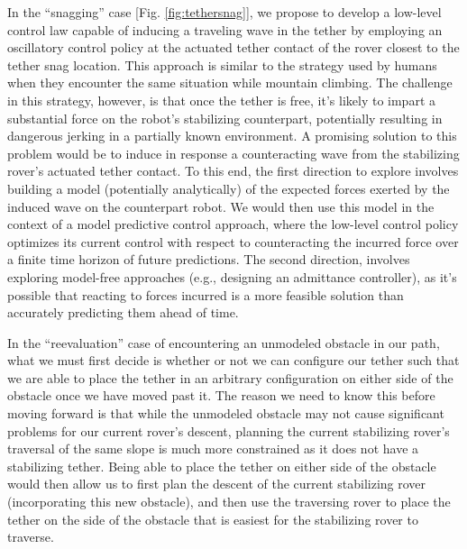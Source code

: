 \documentclass[12pt]{article}
\begin{document}

In the ``snagging'' case [Fig. \ref{fig:tethersnag}], we propose to
develop a low-level control law capable of inducing a traveling wave
in the tether by employing an oscillatory control policy at the
actuated tether contact of the rover closest to the tether snag
location. This approach is similar to the strategy used by humans when
they encounter the same situation while mountain climbing.  The
challenge in this strategy, however, is that once the tether is free,
it's likely to impart a substantial force on the robot's stabilizing
counterpart, potentially resulting in dangerous jerking in a partially
known environment.  A promising solution to this problem would be to
induce in response a counteracting wave from the stabilizing rover's
actuated tether contact. To this end, the first direction to explore
involves building a model (potentially analytically) of the expected
forces exerted by the induced wave on the counterpart robot.  We would
then use this model in the context of a model predictive control
approach, where the low-level control policy optimizes its current
control with respect to counteracting the incurred force over a finite
time horizon of future predictions. The second direction, involves
exploring model-free approaches (e.g., designing an admittance
controller), as it's possible that reacting to forces incurred is a
more feasible solution than accurately predicting them ahead of time.


In the ``reevaluation'' case of encountering an unmodeled obstacle in our
path, what we must first decide is whether or not we can configure our
tether such that we are able to place the tether in an arbitrary
configuration on either side of the obstacle once we have moved past
it. The reason we need to know this before moving forward is that
while the unmodeled obstacle may not cause significant problems for
our current rover's descent, planning the current stabilizing rover's
traversal of the same slope is much more constrained as it does not
have a stabilizing tether. Being able to place the tether on either
side of the obstacle would then allow us to first plan the descent of
the current stabilizing rover (incorporating this new obstacle), and
then use the traversing rover to place the tether on the side of the
obstacle that is easiest for the stabilizing rover to traverse.
\end{document}
